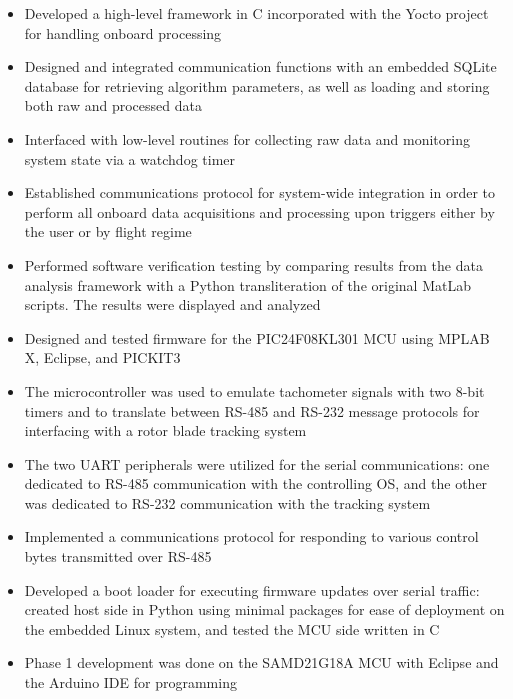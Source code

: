 \documentclass[10pt,a4paper]{article}
\begin{document}
\begin{itemize}
  \item Developed a high-level framework in C incorporated with the Yocto project for handling
  onboard processing

  \item Designed and integrated communication functions with an embedded SQLite database for
  retrieving algorithm parameters, as well as loading and storing both raw and processed
  data

  \item Interfaced with low-level routines for collecting raw data and monitoring system state
  via a watchdog timer

  \item Established communications protocol for system-wide integration in order to perform all
  onboard data acquisitions and processing upon triggers either by the user or by flight
  regime

  \item Performed software verification testing by comparing results from the data analysis
  framework with a Python transliteration of the original MatLab scripts. The results were
  displayed and analyzed

  \item Designed and tested firmware for the PIC24F08KL301 MCU using MPLAB X, Eclipse, and
  PICKIT3

  \item The microcontroller was used to emulate tachometer signals with two 8-bit timers and to
  translate between RS-485 and RS-232 message protocols for interfacing with a rotor blade
  tracking system

  \item The two UART peripherals were utilized for the serial communications: one dedicated to
  RS-485 communication with the controlling OS, and the other was dedicated to RS-232
  communication with the tracking system

  \item Implemented a communications protocol for responding to various control bytes
  transmitted over RS-485

  \item Developed a boot loader for executing firmware updates over serial traffic: created
  host side in Python using
  minimal packages for ease of deployment on the embedded Linux system, and tested the MCU side written in C

  \item Phase 1 development was done on the SAMD21G18A MCU with Eclipse and the Arduino IDE for
  programming


\end{itemize}
\end{document}

